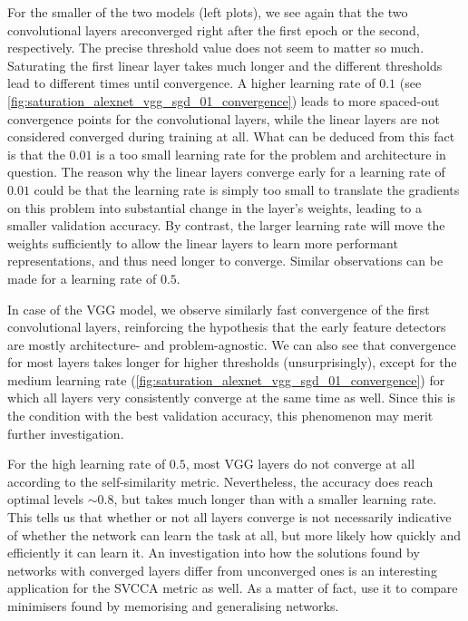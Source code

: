 For the smaller of the two models (left plots), we see again that the two
convolutional layers areconverged right after the first epoch or the second,
respectively. The precise threshold value does not seem to matter so much.
Saturating the first linear layer takes much longer and the different thresholds
lead to different times until convergence. A higher learning rate of $0.1$ (see
\cref{fig:saturation_alexnet_vgg_sgd_01_convergence}) leads to more spaced-out
convergence points for the convolutional layers, while the linear layers are not
considered converged during training at all. What can be deduced from this fact
is that the $0.01$ is a too small learning rate for the problem and architecture
in question. The reason why the linear layers converge early for a learning rate
of $0.01$ could be that the learning rate is simply too small to translate the
gradients on this problem into substantial change in the layer's weights,
leading to a smaller validation accuracy. By contrast, the larger learning rate
will move the weights sufficiently to allow the linear layers to learn more
performant representations, and thus need longer to converge. Similar
observations can be made for a learning rate of $0.5$.

In case of the VGG model, we observe similarly fast convergence of the first
convolutional layers, reinforcing the hypothesis that the early feature
detectors are mostly architecture- and problem-agnostic. We can also see that
convergence for most layers takes longer for higher thresholds (unsurprisingly),
except for the medium learning rate
(\cref{fig:saturation_alexnet_vgg_sgd_01_convergence}) for which all layers very
consistently converge at the same time as well. Since this is the condition with
the best validation accuracy, this phenomenon may merit further investigation.

For the high learning rate of $0.5$, most VGG layers do not converge at all
according to the self-similarity metric. Nevertheless, the accuracy does reach
optimal levels $\sim 0.8$, but takes much longer than with a smaller learning
rate. This tells us that whether or not all layers converge is not necessarily
indicative of whether the network can learn the task at all, but more likely how
quickly and efficiently it can learn it. An investigation into how the solutions
found by networks with converged layers differ from unconverged ones is an
interesting application for the SVCCA metric as well. As a matter of fact,
\citet{NIPS2018_7815} use it to compare minimisers found by memorising and
generalising networks.


